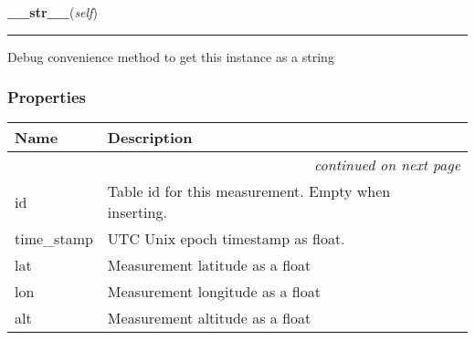     \label{src:dao:model:incoming_gps:incoming_gps:__str__}

    \vspace{0.5ex}

\hspace{.8\funcindent}\begin{boxedminipage}{\funcwidth}

    \raggedright \textbf{\_\_str\_\_}(\textit{self})

    \vspace{-1.5ex}

    \rule{\textwidth}{0.5\fboxrule}
\setlength{\parskip}{2ex}
    Debug convenience method to get this instance as a string

\setlength{\parskip}{1ex}
    \end{boxedminipage}



  \subsubsection{Properties}

    \vspace{-1cm}
\hspace{\varindent}\begin{longtable}{|p{\varnamewidth}|p{\vardescrwidth}|l}
\cline{1-2}
\cline{1-2} \centering \textbf{Name} & \centering \textbf{Description}& \\
\cline{1-2}
\endhead\cline{1-2}\multicolumn{3}{r}{\small\textit{continued on next page}}\\\endfoot\cline{1-2}
\endlastfoot\raggedright i\-d\- & \raggedright Table id for this measurement. Empty when inserting.&\\
\cline{1-2}
\raggedright t\-i\-m\-e\-\_\-s\-t\-a\-m\-p\- & \raggedright UTC Unix epoch timestamp as float.&\\
\cline{1-2}
\raggedright l\-a\-t\- & \raggedright Measurement latitude as a float&\\
\cline{1-2}
\raggedright l\-o\-n\- & \raggedright Measurement longitude as a float&\\
\cline{1-2}
\raggedright a\-l\-t\- & \raggedright Measurement altitude as a float&\\
\cline{1-2}
\end{longtable}

